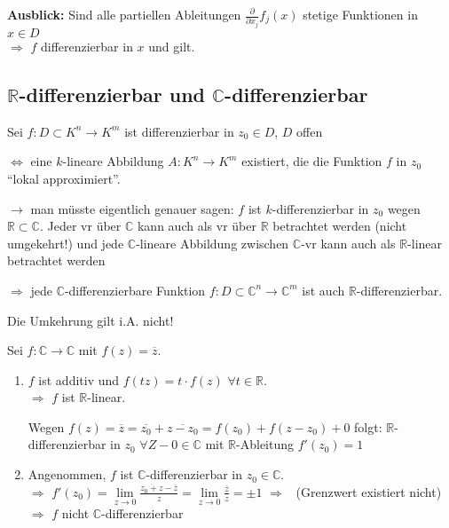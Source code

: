 \textbf{Ausblick:} Sind alle partiellen Ableitungen $\frac{\partial}{\partial x_j} f_j(x)$ stetige Funktionen in $x\in D$ \\
	$\Rightarrow$ $f$ \gls{differenzierbar} in $x$ und  gilt.

\subsection{$\mathbf{\mathbb{R}}$-differenzierbar und $\mathbf{\mathbb{C}}$-differenzierbar}
Sei $f:D\subset K^n\to K^m$ ist \gls{differenzierbar} in $z_0 \in D$, $D$ offen

$\Leftrightarrow$ eine $k$-lineare Abbildung $A:K^n\to K^m$ existiert, die die Funktion $f$ in $z_0$ "`lokal approximiert"'.

$\rightarrow$ man müsste eigentlich genauer sagen: $f$ ist $k$-\gls{differenzierbar} in $z_0$ wegen $\mathbb{R}\subset\mathbb{C}$. Jeder \gls{vr} über $\mathbb{C}$ kann auch als \gls{vr} über $\mathbb{R}$ betrachtet werden (nicht umgekehrt!) und jede $\mathbb{C}$-lineare Abbildung zwischen $\mathbb{C}$-\gls{vr} kann auch als $\mathbb{R}$-linear betrachtet werden

$\Rightarrow$ jede $\mathbb{C}$-\gls{differenzierbar}e Funktion $f:D\subset \mathbb{C}^n\to \mathbb{C}^m$ ist auch $\mathbb{R}$-\gls{differenzierbar}.

Die Umkehrung gilt i.A. nicht!

\begin{example}
	Sei $f:\mathbb{C}\to\mathbb{C}$ mit $f(z) = \overline{z}$.
	\begin{enumerate}[label={\alph*)}]
		\item $f$ ist additiv und $f(tz) = t\cdot f(z)$ $\forall t\in \mathbb{R}$. \\
		$\Rightarrow$ $f$ ist $\mathbb{R}$-linear.
		
		Wegen $f(z) = \overline{z} = \overline{z_0} + \overline{z - z_0} = f(z_0) + f(z - z_0) + 0$ folgt: $\mathbb{R}$-\gls{differenzierbar} in $z_0$ $\forall Z-0\in\mathbb{C}$ mit $\mathbb{R}$-Ableitung $f'(z_0) = 1$
		
		\item Angenommen, $f$ ist $\mathbb{C}$-\gls{differenzierbar} in $z_0\in\mathbb{C}$.\\
		$\Rightarrow$ $f'(z_0) = \lim\limits_{z\to 0} \frac{\overline{z_0 + z} - \overline{z}}{z} = \lim\limits_{z\to 0} \frac{\overline{z}}{z} = \pm 1$ $\Rightarrow$ \Lightning\ (Grenzwert existiert nicht) \\
		$\Rightarrow$ $f$ nicht $\mathbb{C}$-\gls{differenzierbar}
	\end{enumerate}
\end{example}

